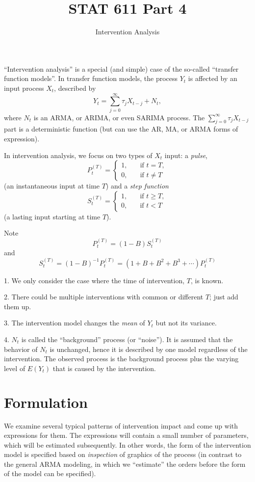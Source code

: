 \documentclass[12pt]{article}
\begin{document}
\title{STAT 611 Part 4}
\subtitle{Intervention Analysis}
\maketitle

``Intervention analysis'' is a special (and simple) case of the
so-called ``transfer function models''.
In transfer function models,
the process $Y_t$ is affected by an input process $X_t$,
described by
\[
Y_t = \sum_{j=0}^\infty \tau_j X_{t-j} + N_t
,
\]
where $N_t$ is an ARMA, or ARIMA, or even SARIMA process.
The $\sum_{j=0}^\infty \tau_j X_{t-j}$ part is a deterministic function
(but can use the AR, MA, or ARMA forms of expression).

In intervention analysis, we focus on two types of $X_t$ input:
a \emph{pulse},
\[
P_t^{(T)} =
\begin{cases}
    1,\quad & \text{if $t = T$},\\
    0,      & \text{if $t \ne T$}
\end{cases}
\]
(an instantaneous input at time $T$)
and a \emph{step function}
\[
S_t^{(T)} =
\begin{cases}
    1,\quad & \text{if $t \ge T$},\\
    0,      & \text{if $t < T$}
\end{cases}
\]
(a lasting input starting at time $T$).

Note
\[
P_t^{(T)} = (1 - B) S_t^{(T)}
\]
and
\[
S_t^{(T)}
= (1 - B)^{-1} P_t^{(T)}
= (1 + B + B^2 + B^3 +\dotsb) P_t^{(T)}
\]

\alert
1. We only consider the case where the time of intervention, $T$, is
known.

2. There could be multiple interventions with common or different $T$;
just add them up.

3. The intervention model changes the \emph{mean} of $Y_t$ but not its
variance.

4. $N_t$ is called the ``background'' process (or ``noise'').
It is assumed that the behavior of $N_t$ is unchanged,
hence it is described by one model regardless of the intervention.
The observed process is the background process plus the varying level of
$E(Y_t)$ that is caused by the intervention.


\section{Formulation}

We examine several typical patterns of intervention impact and come up
with expressions for them.
The expressions will contain a small number of parameters,
which will be estimated subsequently.
In other words,
the form of the intervention model is specified based on
\emph{inspection} of graphics of the process
(in contrast to the general ARMA modeling, in which we
``estimate'' the orders before the form of the model can be specified).
\end{document}
